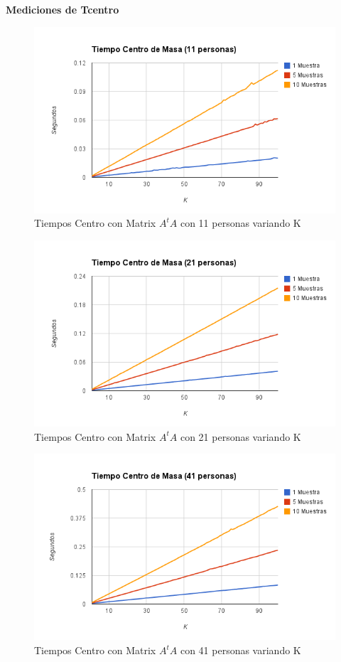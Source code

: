 \textbf{Mediciones de Tcentro }

\begin{figure}[H] \includegraphics[width=1\textwidth]{img/image7.png} \caption{Tiempos Centro con
    Matrix $A^tA$ con 11 personas variando K} \end{figure}

\begin{figure}[H] \includegraphics[width=1\textwidth]{img/image8.png} \caption{Tiempos Centro con
    Matrix $A^tA$ con 21 personas variando K} \end{figure}

\begin{figure}[H] \includegraphics[width=1\textwidth]{img/image9.png} \caption{Tiempos Centro con
    Matrix $A^tA$ con 41 personas variando K} \end{figure}



